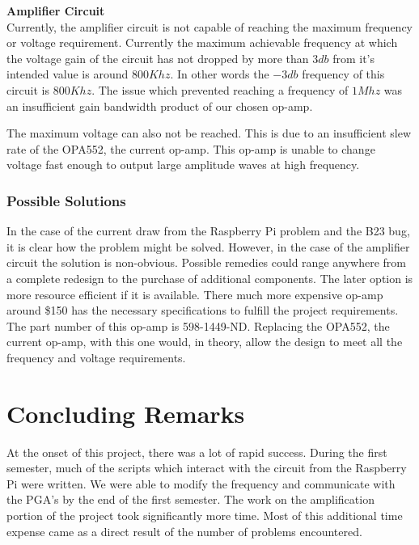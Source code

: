 \documentclass{article}	%
\begin{document}
\begin{multicols}{2}
\textbf{Amplifier Circuit}\\
Currently,
the amplifier circuit is not capable of reaching 
the maximum frequency or voltage requirement.
Currently the maximum achievable frequency 
at which the voltage gain of the circuit has
not dropped by more than $3db$ from it's intended value is
around $800Khz$.
In other words the $-3db$ frequency of this circuit is $800Khz$.
The issue which prevented reaching a frequency of $1Mhz$ was
an insufficient gain bandwidth product of our chosen op-amp.

The maximum voltage can also not be reached.
This is due to an insufficient slew rate
of the OPA552, the current op-amp.
This op-amp is unable to change voltage fast enough
to output large amplitude waves at high frequency.

\subsubsection{Possible Solutions}
In the case of 
the current draw from the Raspberry Pi problem and
the B23 bug,
it is clear how the problem might be solved.
However, in the case of  the amplifier circuit
the solution is non-obvious.
Possible remedies could range anywhere from a complete redesign
to the purchase of additional components.
The later option is more resource efficient 
if it is available.
There much more expensive op-amp around \$150 has
the necessary specifications
to fulfill the project requirements.
The part number of this op-amp is
598-1449-ND.
Replacing the OPA552, the current op-amp,
with this one would, in theory,
allow the design to meet all the frequency and voltage requirements.

\section{Concluding Remarks}
At the onset of this project,
there was a lot of rapid success.
During the first semester,
much of the scripts which
interact with the circuit from
the Raspberry Pi were written.
We were able to modify the frequency 
and communicate with the PGA's by 
the end of the first semester.
The work on the amplification portion 
of the project took significantly more time.
Most of this additional time expense came
as a direct result of 
the number of problems encountered.


\end{multicols}
\end{document}
